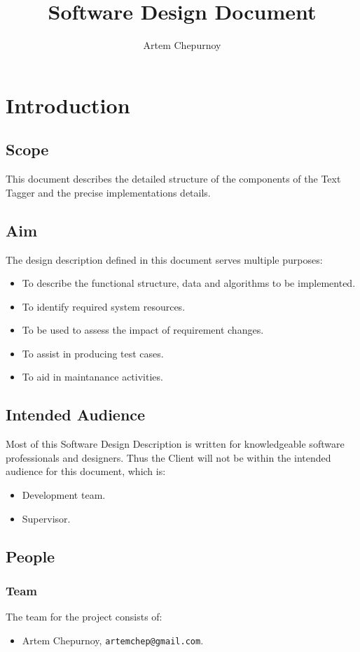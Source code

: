 \documentclass[a4paper,14pt,oneside,final]{memoir}
\title{Software Design Document}
\author{Artem Chepurnoy}
\begin{document}
\maketitle

\clearpage
\tableofcontents

\chapter{Introduction}
\section{Scope}
This document describes the detailed structure of the components of the Text Tagger and the precise implementations details.

\section{Aim}
The design description defined in this document serves multiple purposes:
\begin{itemize}
    \item To describe the functional structure, data and algorithms to be implemented.
    \item To identify required system resources.
    \item To be used to assess the impact of requirement changes.
    \item To assist in producing test cases.
    \item To aid in maintanance activities.
\end{itemize}

\section{Intended Audience}
Most of this Software Design Description is written for knowledgeable software professionals and designers.
Thus the Client will not be within the intended audience for this document, which is:
\begin{itemize}
    \item Development team.
    \item Supervisor.
\end{itemize}

\section{People}
\subsection{Team}
The team for the project consists of:
\begin{itemize}
    \item Artem Chepurnoy, \texttt{artemchep@gmail.com}.
\end{itemize}
\end{document}
